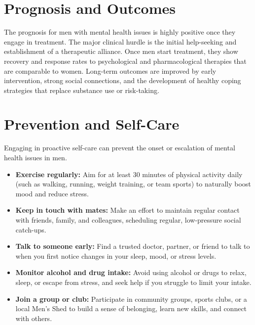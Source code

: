 \section*{Prognosis and Outcomes}
The prognosis for men with mental health issues is highly positive once they engage in treatment. The major clinical hurdle is the initial help-seeking and establishment of a therapeutic alliance. Once men start treatment, they show recovery and response rates to psychological and pharmacological therapies that are comparable to women. Long-term outcomes are improved by early intervention, strong social connections, and the development of healthy coping strategies that replace substance use or risk-taking.

\section*{Prevention and Self-Care}
Engaging in proactive self-care can prevent the onset or escalation of mental health issues in men.
\begin{itemize}
    \item \textbf{Exercise regularly:} Aim for at least 30 minutes of physical activity daily (such as walking, running, weight training, or team sports) to naturally boost mood and reduce stress.
    \item \textbf{Keep in touch with mates:} Make an effort to maintain regular contact with friends, family, and colleagues, scheduling regular, low-pressure social catch-ups.
    \item \textbf{Talk to someone early:} Find a trusted doctor, partner, or friend to talk to when you first notice changes in your sleep, mood, or stress levels.
    \item \textbf{Monitor alcohol and drug intake:} Avoid using alcohol or drugs to relax, sleep, or escape from stress, and seek help if you struggle to limit your intake.
    \item \textbf{Join a group or club:} Participate in community groups, sports clubs, or a local Men's Shed to build a sense of belonging, learn new skills, and connect with others.
\end{itemize}

